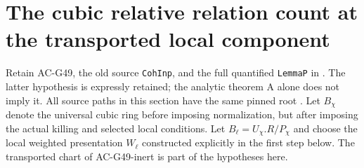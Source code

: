 \section{The cubic relative relation count at the transported local component}
\label{sec:cubic-box-presentation}

Retain AC-G49, the old source \texttt{CohInp}, and the full
quantified \texttt{LemmaP} in
.
The latter hypothesis is expressly retained; the analytic
theorem A alone does not imply it.
All source paths in this section have the same pinned root
.
Let $B_\chi$ denote the universal cubic ring before imposing
normalization, but after imposing the actual killing and
selected local conditions.  Let
$B_\ell=U_\chi.R/P_\chi$ and choose the local weighted
presentation $W_\ell$ constructed explicitly in the first
step below.  The transported chart of AC-G49-inert
is part of the hypotheses here.

